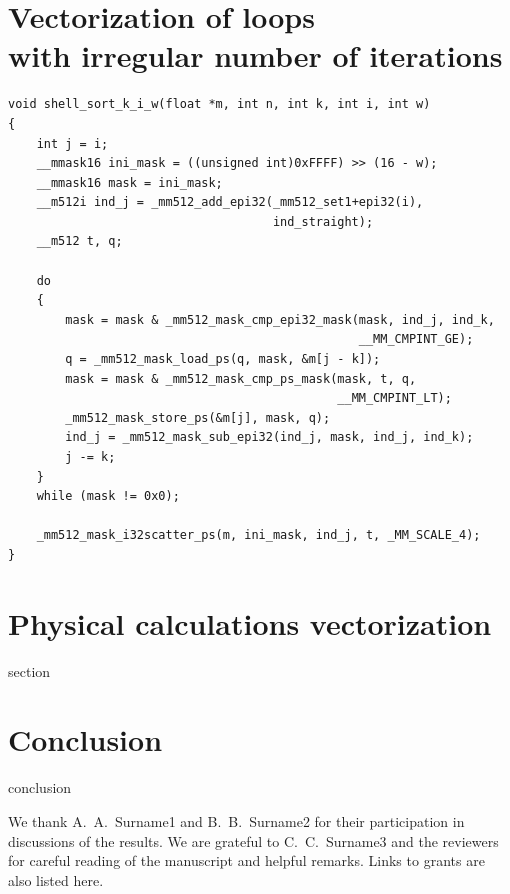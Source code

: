 \documentclass[
11pt,%
tightenlines,%
twoside,%
onecolumn,%
nofloats,%
nobibnotes,%
nofootinbib,%
superscriptaddress,%
noshowpacs,%
centertags]%
{revtex4}
\begin{document}
\section{Vectorization of loops \protect\\
with irregular number of iterations}

\begin{lstlisting}
void shell_sort_k_i_w(float *m, int n, int k, int i, int w)
{
    int j = i;
    __mmask16 ini_mask = ((unsigned int)0xFFFF) >> (16 - w);
    __mmask16 mask = ini_mask;
    __m512i ind_j = _mm512_add_epi32(_mm512_set1+epi32(i),
                                     ind_straight);
    __m512 t, q;

    do
    {
        mask = mask & _mm512_mask_cmp_epi32_mask(mask, ind_j, ind_k,
                                                 __MM_CMPINT_GE);
        q = _mm512_mask_load_ps(q, mask, &m[j - k]);
        mask = mask & _mm512_mask_cmp_ps_mask(mask, t, q,
                                              __MM_CMPINT_LT);
        _mm512_mask_store_ps(&m[j], mask, q);
        ind_j = _mm512_mask_sub_epi32(ind_j, mask, ind_j, ind_k);
        j -= k;
    }
    while (mask != 0x0);
    
    _mm512_mask_i32scatter_ps(m, ini_mask, ind_j, t, _MM_SCALE_4);
}
\end{lstlisting}

\section{Physical calculations vectorization}

section

\section{Conclusion}

conclusion

\begin{acknowledgments}
We thank A.~A.~Surname1 and B.~B.~Surname2 for their participation in discussions of the results. We are grateful to C.~C.~Surname3 and the reviewers for careful reading of the manuscript and helpful remarks. Links to grants are also listed here.
\end{acknowledgments}
\end{document}
